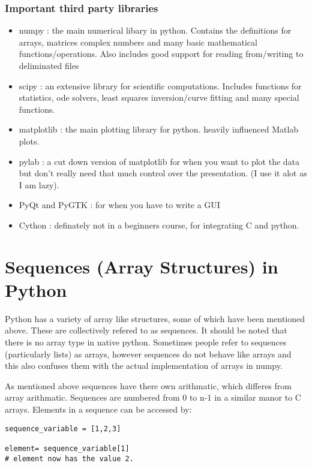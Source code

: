 \documentclass[11pt,a4paper]{article}
\begin{document}
\subsubsection{Important third party libraries}
\begin{itemize}
\item numpy : the main numerical libary in python. Contains the definitions for arrays, matrices complex numbers and many basic mathematical functions/operations. Also includes good support for reading from/writing to deliminated files
\item scipy : an extensive library for scientific computations. Includes functions for statistics, ode solvers, least squares inversion/curve fitting and many special functions.
\item matplotlib : the main plotting library for python. heavily influenced Matlab plots.
\item pylab : a cut down version of matplotlib for when you want to plot the data but don't really need that much control over the presentation. (I use it alot as I am lazy).
\item PyQt and PyGTK : for when you have to write a GUI
\item Cython : definately not in a beginners course, for integrating C and python.
\end{itemize}

\section{Sequences (Array Structures) in Python} \label{sequences}

Python has a variety of array like structures, some of which have been mentioned above. These are collectively refered to as sequences. It should be noted that there is no array type in native python. Sometimes people refer to sequences (particularly lists) as arrays, however sequences do not behave like arrays and this also confuses them with the actual implementation of arrays in numpy.

As mentioned above sequences have there own arithmatic, which differes from array arithmatic. Sequences are numbered from 0 to n-1 in a similar manor to C arrays. Elements in a sequence can be accessed by:

\begin{verbatim}
sequence_variable = [1,2,3]

element= sequence_variable[1]
# element now has the value 2.
\end{verbatim}
\end{document}
